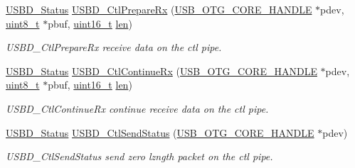 \begin{DoxyCompactItemize}
\hyperlink{group___u_s_b_d___c_o_r_e___exported___defines_ga1c59ec10075b576176aa51c9ef4e9fc4}{U\-S\-B\-D\-\_\-\-Status} \hyperlink{group___u_s_b_d___i_o_r_e_q___private___functions_gafbfbe059daddfa13cd57db3e9613a71b}{U\-S\-B\-D\-\_\-\-Ctl\-Prepare\-Rx} (\hyperlink{group___u_s_b___c_o_r_e___exported___types_gaf76054c11eb8a3367907aad7ae700e80}{U\-S\-B\-\_\-\-O\-T\-G\-\_\-\-C\-O\-R\-E\-\_\-\-H\-A\-N\-D\-L\-E} $\ast$pdev, \hyperlink{stdint_8h_aba7bc1797add20fe3efdf37ced1182c5}{uint8\-\_\-t} $\ast$pbuf, \hyperlink{stdint_8h_a273cf69d639a59973b6019625df33e30}{uint16\-\_\-t} \hyperlink{mavlink__helpers_8h_aba59486c1504340293255a065b546e3a}{len})
\begin{DoxyCompactList}\small\item\em U\-S\-B\-D\-\_\-\-Ctl\-Prepare\-Rx receive data on the ctl pipe. \end{DoxyCompactList}\item 
\hyperlink{group___u_s_b_d___c_o_r_e___exported___defines_ga1c59ec10075b576176aa51c9ef4e9fc4}{U\-S\-B\-D\-\_\-\-Status} \hyperlink{group___u_s_b_d___i_o_r_e_q___private___functions_ga4f4543400519f6194c3c50e9eddf38fb}{U\-S\-B\-D\-\_\-\-Ctl\-Continue\-Rx} (\hyperlink{group___u_s_b___c_o_r_e___exported___types_gaf76054c11eb8a3367907aad7ae700e80}{U\-S\-B\-\_\-\-O\-T\-G\-\_\-\-C\-O\-R\-E\-\_\-\-H\-A\-N\-D\-L\-E} $\ast$pdev, \hyperlink{stdint_8h_aba7bc1797add20fe3efdf37ced1182c5}{uint8\-\_\-t} $\ast$pbuf, \hyperlink{stdint_8h_a273cf69d639a59973b6019625df33e30}{uint16\-\_\-t} \hyperlink{mavlink__helpers_8h_aba59486c1504340293255a065b546e3a}{len})
\begin{DoxyCompactList}\small\item\em U\-S\-B\-D\-\_\-\-Ctl\-Continue\-Rx continue receive data on the ctl pipe. \end{DoxyCompactList}\item 
\hyperlink{group___u_s_b_d___c_o_r_e___exported___defines_ga1c59ec10075b576176aa51c9ef4e9fc4}{U\-S\-B\-D\-\_\-\-Status} \hyperlink{group___u_s_b_d___i_o_r_e_q___private___functions_gaa3d017e61e3a77abbf7560f94fd945da}{U\-S\-B\-D\-\_\-\-Ctl\-Send\-Status} (\hyperlink{group___u_s_b___c_o_r_e___exported___types_gaf76054c11eb8a3367907aad7ae700e80}{U\-S\-B\-\_\-\-O\-T\-G\-\_\-\-C\-O\-R\-E\-\_\-\-H\-A\-N\-D\-L\-E} $\ast$pdev)
\begin{DoxyCompactList}\small\item\em U\-S\-B\-D\-\_\-\-Ctl\-Send\-Status send zero lzngth packet on the ctl pipe. \end{DoxyCompactList}\item 

\end{DoxyCompactItemize}
